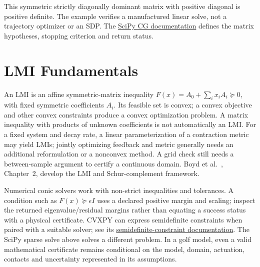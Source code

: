 \documentclass[10pt,letterpaper,openany]{book}
\theoremstyle{plain}
\theoremstyle{definition}
\theoremstyle{remark}
\begin{document}
This symmetric strictly diagonally dominant matrix with positive diagonal is
positive definite. The example verifies a manufactured linear solve, not a
trajectory optimizer or an SDP. The
\href{https://docs.scipy.org/doc/scipy/reference/generated/scipy.sparse.linalg.cg.html}{SciPy CG documentation}
defines the matrix hypotheses, stopping criterion and return status.

\section{LMI Fundamentals}

An LMI is an affine symmetric-matrix inequality
$F(x)=A_0+\sum_i x_iA_i\succeq0$, with fixed symmetric coefficients $A_i$.
Its feasible set is convex; a convex objective and other convex constraints
produce a convex optimization problem. A matrix inequality with products of
unknown coefficients is not automatically an LMI. For a fixed system and decay
rate, a linear parameterization of a contraction metric may yield LMIs; jointly
optimizing feedback and metric generally needs an additional reformulation or
a nonconvex method. A grid check still needs a between-sample argument to certify
a continuous domain. Boyd et al.~\cite{Boyd1994}, Chapter~2, develop the LMI and
Schur-complement framework.

Numerical conic solvers work with non-strict inequalities and tolerances. A
condition such as $F(x)\succeq\epsilon I$ uses a declared positive margin and
scaling; inspect the returned eigenvalue/residual margins rather than equating
a success status with a physical certificate. CVXPY can express semidefinite
constraints when paired with a suitable solver; see its
\href{https://www.cvxpy.org/tutorial/constraints/index.html}{semidefinite-constraint documentation}.
The SciPy sparse solve above solves a different problem. In a golf model, even a
valid mathematical certificate remains conditional on the model, domain,
actuation, contacts and uncertainty represented in its assumptions.



\end{document}

